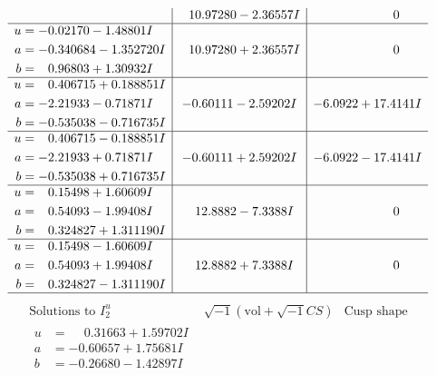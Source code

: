 \documentclass[1p]{elsarticle_modified}
\theoremstyle{definition}
\newcommand{\I}{\sqrt{-1}}
\begin{document}
$$\begin{array}{c|c|c}
 & \phantom{-}10.97280 - 2.36557 I & \phantom{-0.000000 } 0 \\ \hline\begin{aligned}
u &= -0.02170 - 1.48801 I \\
a &= -0.340684 - 1.352720 I \\
b &= \phantom{-}0.96803 + 1.30932 I\end{aligned}
 & \phantom{-}10.97280 + 2.36557 I & \phantom{-0.000000 } 0 \\ \hline\begin{aligned}
u &= \phantom{-}0.406715 + 0.188851 I \\
a &= -2.21933 - 0.71871 I \\
b &= -0.535038 - 0.716735 I\end{aligned}
 & -0.60111 - 2.59202 I & -6.0922 + 17.4141 I \\ \hline\begin{aligned}
u &= \phantom{-}0.406715 - 0.188851 I \\
a &= -2.21933 + 0.71871 I \\
b &= -0.535038 + 0.716735 I\end{aligned}
 & -0.60111 + 2.59202 I & -6.0922 - 17.4141 I \\ \hline\begin{aligned}
u &= \phantom{-}0.15498 + 1.60609 I \\
a &= \phantom{-}0.54093 - 1.99408 I \\
b &= \phantom{-}0.324827 + 1.311190 I\end{aligned}
 & \phantom{-}12.8882 - 7.3388 I & \phantom{-0.000000 } 0 \\ \hline\begin{aligned}
u &= \phantom{-}0.15498 - 1.60609 I \\
a &= \phantom{-}0.54093 + 1.99408 I \\
b &= \phantom{-}0.324827 - 1.311190 I\end{aligned}
 & \phantom{-}12.8882 + 7.3388 I & \phantom{-0.000000 } 0\\
 \hline 
 \end{array}$$\newpage$$\begin{array}{c|c|c}  
\text{Solutions to }I^u_{2}& \I (\text{vol} + \sqrt{-1}CS) & \text{Cusp shape}\\
 \hline 
\begin{aligned}
u &= \phantom{-}0.31663 + 1.59702 I \\
a &= -0.60657 + 1.75681 I \\
b &= -0.26680 - 1.42897 I\end{aligned}

\end{array}$$
\end{document}
